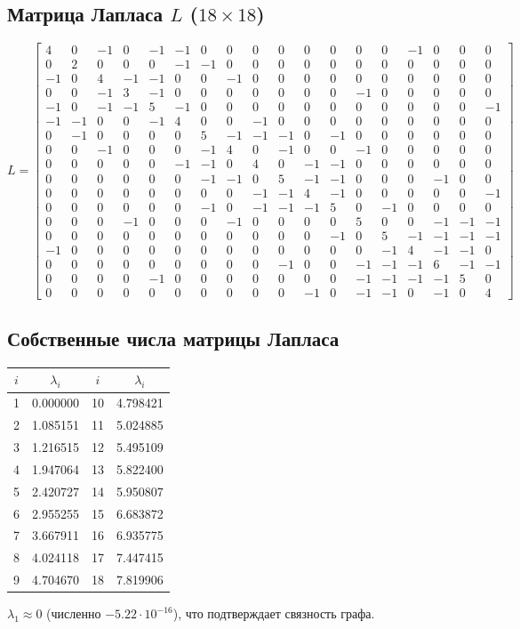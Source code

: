 \documentclass[12pt,a4paper]{article}
\begin{document}
\subsection{Матрица Лапласа $L$ ($18\times18$)}
\begingroup\footnotesize\setlength{\arraycolsep}{3pt}
\[
L=
\left[\begin{array}{rrrrrrrrrrrrrrrrrr}
4&0&-1&0&-1&-1&0&0&0&0&0&0&0&0&-1&0&0&0\\
0&2&0&0&0&-1&-1&0&0&0&0&0&0&0&0&0&0&0\\
-1&0&4&-1&-1&0&0&-1&0&0&0&0&0&0&0&0&0&0\\
0&0&-1&3&-1&0&0&0&0&0&0&0&-1&0&0&0&0&0\\
-1&0&-1&-1&5&-1&0&0&0&0&0&0&0&0&0&0&0&-1\\
-1&-1&0&0&-1&4&0&0&-1&0&0&0&0&0&0&0&0&0\\
0&-1&0&0&0&0&5&-1&-1&-1&0&-1&0&0&0&0&0&0\\
0&0&-1&0&0&0&-1&4&0&-1&0&0&-1&0&0&0&0&0\\
0&0&0&0&0&-1&-1&0&4&0&-1&-1&0&0&0&0&0&0\\
0&0&0&0&0&0&-1&-1&0&5&-1&-1&0&0&0&-1&0&0\\
0&0&0&0&0&0&0&0&-1&-1&4&-1&0&0&0&0&0&-1\\
0&0&0&0&0&0&-1&0&-1&-1&-1&5&0&-1&0&0&0&0\\
0&0&0&-1&0&0&0&-1&0&0&0&0&5&0&0&-1&-1&-1\\
0&0&0&0&0&0&0&0&0&0&0&-1&0&5&-1&-1&-1&-1\\
-1&0&0&0&0&0&0&0&0&0&0&0&0&-1&4&-1&-1&0\\
0&0&0&0&0&0&0&0&0&-1&0&0&-1&-1&-1&6&-1&-1\\
0&0&0&0&-1&0&0&0&0&0&0&0&-1&-1&-1&-1&5&0\\
0&0&0&0&0&0&0&0&0&0&-1&0&-1&-1&0&-1&0&4
\end{array}\right]
\]
\endgroup

\subsection{Собственные числа матрицы Лапласа}
\begin{center}
\footnotesize
\begin{tabular}{|c|c|c|c|}
\hline
$i$ & $\lambda_i$ & $i$ & $\lambda_i$ \\ \hline
1 & 0.000000 & 10 & 4.798421 \\
2 & 1.085151 & 11 & 5.024885 \\
3 & 1.216515 & 12 & 5.495109 \\
4 & 1.947064 & 13 & 5.822400 \\
5 & 2.420727 & 14 & 5.950807 \\
6 & 2.955255 & 15 & 6.683872 \\
7 & 3.667911 & 16 & 6.935775 \\
8 & 4.024118 & 17 & 7.447415 \\
9 & 4.704670 & 18 & 7.819906 \\ \hline
\end{tabular}
\end{center}
$\lambda_1\approx0$ (численно $-5.22\cdot10^{-16}$), что подтверждает связность графа.
\end{document}
